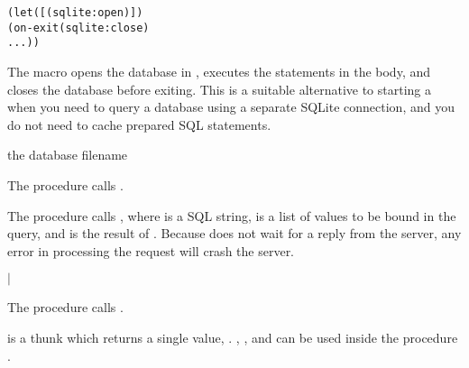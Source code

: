 \begin{syntax}
\end{syntax}
\expandsto{} \antipar\begin{alltt}
(let ([ (sqlite:open  )])
  (on-exit (sqlite:close )
      ...))
\end{alltt}

The  macro opens the database in ,
executes the statements in the body, and closes the database before
exiting.  This is a suitable alternative to starting a
 when you need to query a database using a separate
SQLite connection, and you do not need to cache prepared SQL
statements.

\begin{procedure}
\end{procedure}
\returns{} the database filename

The  procedure calls .

\begin{procedure}
\end{procedure}
\returns{}

The  procedure calls , where  is a SQL string,
 is a list of values to be bound in the query, and
 is the result of .
Because  does not wait for a reply from the server, any
error in processing the request will crash the server.

\begin{procedure}
\end{procedure}
\returns{}
 $|$

The  procedure calls .

 is a thunk which returns a single value,
. , , and
 can be used inside the procedure .

